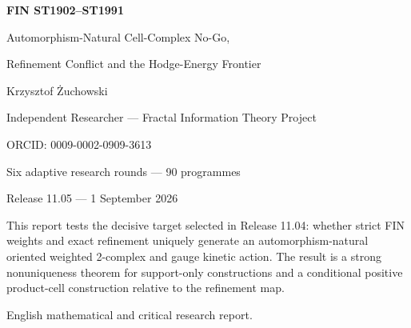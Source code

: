 \documentclass[11pt,a4paper]{article}
\begin{document}
\begin{titlepage}\centering\vspace*{14mm}
{\Huge\bfseries FIN ST1902--ST1991\par}\vspace{4mm}
{\LARGE Automorphism-Natural Cell-Complex No-Go,\par}\vspace{2mm}
{\LARGE Refinement Conflict and the Hodge-Energy Frontier\par}\vspace{12mm}
{\Large Krzysztof \.Zuchowski\par}
{\normalsize Independent Researcher --- Fractal Information Theory Project\par}
{\normalsize ORCID: 0009-0002-0909-3613\par}\vspace{9mm}
{\large Six adaptive research rounds --- 90 programmes\par}
{\large Release 11.05 --- 1 September 2026\par}
\vfill
\begin{minipage}{.87\textwidth}\small
This report tests the decisive target selected in Release 11.04: whether strict
FIN weights and exact refinement uniquely generate an automorphism-natural
oriented weighted 2-complex and gauge kinetic action.  The result is a strong
nonuniqueness theorem for support-only constructions and a conditional positive
product-cell construction relative to the refinement map.
\end{minipage}\vfill
{\small English mathematical and critical research report.}
\end{titlepage}
\end{document}
